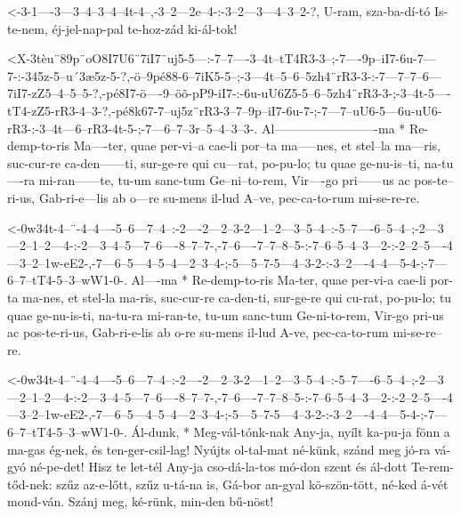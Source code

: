   {<-3-1----3---3--4--3--4--4t-4--,-3--2---2e--4-:-3--2---3---4--3--2-?,}
  {  U-ram, sza-ba-dí-tó Is-te-nem, éj-jel-nap-pal te-hoz-zád ki-ál-tok!}

  {<X-3tèu¨89p¨oO8I7U6¨7iI7¨uj5-5---:-7--7----3--4t--tT4R3-3--;-7----9p--iI7-6u-7---7-:-345z-5--u´3æ5z-5-?,-ö--9pé88-6--7iK5-5--;-3---4t--5--6--5zh4¨rR3-3-:-7---7--7--6---7iI7-zZ5--4--5--5-?,-pé8I7-ö----9--öõ-pP9-iI7-:-6u-uU6Z5-5--6--5zh4¨rR3-3-;-3--4t-5----tT4-zZ5-rR3-4--3-?,-pé8k67-7--uj5z¨rR3-3--7--9p--iI7-6u-7-;-7---7--uU6-5---6u-uU6-rR3-:-3--4t---6--rR3-4t-5-;-7---6--7--3r--5--4--3--3-.}
  {   Al-------------------------ma * Re-demp-to-ris Ma----ter, quae per-vi--a  cae-li  por--ta ma-----nes, et stel--la ma---ris, suc-cur-re ca-den------ti, sur-ge-re qui cu---rat, po-pu-lo;  tu    quae ge-nu-is--ti,   na-tu----ra mi-ran------te, tu-um sanc-tum Ge--ni--to-rem, Vir----go pri------us ac pos-te--ri-us, Gab-ri-e---lis ab o---re    su-mens il-lud A--ve, pec-ca-to-rum mi-se-re-re.}

  {<-0w34t-4--¨-4--4----5--6---7--4--:-2----2---2--3-2---1--2---3--5--4--:-5--7----6--5--4--;-2---3---2--1--2---4-:-2---3--4--5---7--6----8--7--7-,-7--6----7--7--8--5-:-7--6--5--4--3---2-:-2--2--5----4---3--2--1w-eE2-,-7---6--5---4--5--4---2--3--4-;-5---5--7-5---4--3-2-:-3--2----4--4---5-4-;-7---6--7--tT4-5--3--wW1-0-.}
  {  Al----ma * Re-demp-to-ris Ma-ter, quae per-vi-a cae-li por-ta ma-nes, et stel-la ma-ris, suc-cur-re ca-den-ti, sur-ge-re qui cu-rat, po-pu-lo; tu quae ge-nu-is-ti, na-tu-ra mi-ran-te, tu-um sanc-tum Ge-ni-to-rem,  Vir-go pri-us ac pos-te-ri-us, Gab-ri-e-lis ab o-re  su-mens il-lud A-ve, pec-ca-to-rum mi-se-re--re.}

  {<-0w34t-4--¨-4--4----5--6---7--4--:-2----2---2--3-2---1--2---3--5--4--:-5--7----6--5--4--;-2---3---2--1--2---4-:-2---3--4--5---7--6----8--7--7-,-7--6----7--7--8--5-:-7--6--5--4--3---2-:-2--2--5----4---3--2--1w-eE2-,-7---6--5---4--5--4---2--3--4-;-5---5--7-5---4--3-2-:-3--2----4--4---5-4-;-7---6--7--tT4-5--3--wW1-0-.}
  {  Ál-dunk, * Meg-vál-tónk-nak Any-ja, nyílt ka-pu-ja fönn a ma-gas ég-nek, és ten-ger-csil-lag! Nyújts ol-tal-mat né-künk, szánd meg jó-ra vá-gyó né-pe-det! Hisz te let-tél Any-ja cso-dá-la-tos mó-don szent és ál-dott Te-rem-tőd-nek: szűz az-e-lőtt, szűz u-tá-na is, Gá-bor an-gyal kö-szön-tött, né-ked á-vét mond-ván. Szánj meg, ké-rünk, min-den bű-nöst!}

